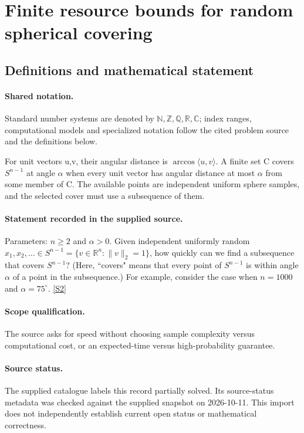 \documentclass[11pt]{article}
\newcommand{\sref}[2]{\hyperlink{source:#1:#2}{[S#2]}}
\begin{document}
\section{Finite resource bounds for random spherical covering}\label{statement}

\subsection{Definitions and mathematical statement}

\paragraph{Shared notation.}Standard number systems are denoted by $\mathbb N,\mathbb Z,\mathbb Q,\mathbb R,\mathbb C$; index ranges, computational models and specialized notation follow the cited problem source and the definitions below.


For unit vectors u,v, their angular distance is $\arccos\langle u,v\rangle$. A finite set C covers $S^{n-1}$ at angle $\alpha$ when every unit vector has angular distance at most $\alpha$ from some member of C. The available points are independent uniform sphere samples, and the selected cover must use a subsequence of them.
\paragraph{Statement recorded in the supplied source.}
Parameters: $n \geq 2$ and $\alpha > 0$. Given independent uniformly random $x_1, x_2, \dots\in S^{n-1} = \{v \in \mathbb R^n : \|v\|_2 = 1\}$, how quickly can we find a subsequence that covers $S^{n-1}$? (Here, ``covers" means that every point of $S^{n-1}$ is within angle $\alpha$ of a point in the subsequence.) For example, consider the case when $n = 1000$ and $\alpha = 75^\circ$. \sref{statement}{2}
\paragraph{Scope qualification.}
The source asks for speed without choosing sample complexity versus computational cost, or an expected-time versus high-probability guarantee.
\paragraph{Source status.}
The supplied catalogue labels this record partially solved. Its source-status metadata was checked against the supplied snapshot on 2026-10-11. This import does not independently establish current open status or mathematical correctness.
\end{document}
